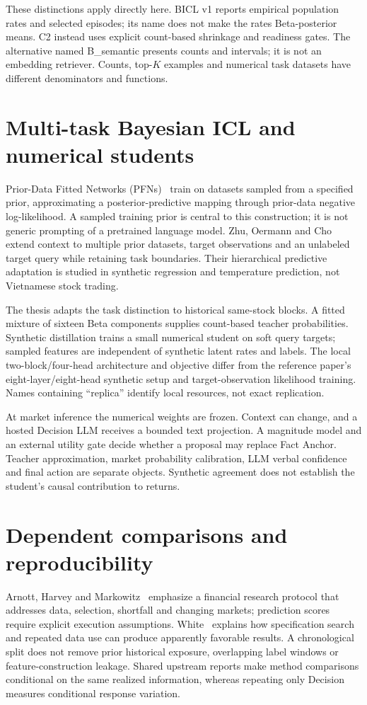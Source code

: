 These distinctions apply directly here. BICL v1 reports empirical
population rates and selected episodes; its name does not make the rates
Beta-posterior means. C2 instead uses explicit count-based shrinkage and
readiness gates. The alternative named B\_semantic presents counts and
intervals; it is not an embedding retriever. Counts, top-$K$ examples and
numerical task datasets have different denominators and functions.

\section{Multi-task Bayesian ICL and numerical students}\label{s:b46bc1f71efb86f5}
Prior-Data Fitted Networks (PFNs)~\cite{muller2022transformers} train on datasets sampled from a specified
prior, approximating a posterior-predictive mapping through prior-data
negative log-likelihood. A sampled training prior is central to this
construction; it is not generic prompting of a pretrained language model.
Zhu, Oermann and Cho~\cite{zhu2026multitask} extend context to
multiple prior datasets, target observations and an unlabeled target
query while retaining task boundaries. Their hierarchical predictive
adaptation is studied in synthetic regression and temperature prediction,
not Vietnamese stock trading.

The thesis adapts the task distinction to historical same-stock blocks.
A fitted mixture of sixteen Beta components supplies count-based teacher
probabilities. Synthetic distillation trains a small numerical student
on soft query targets; sampled features are independent of synthetic
latent rates and labels. The local two-block/four-head architecture and
objective differ from the reference paper's eight-layer/eight-head
synthetic setup and target-observation likelihood training. Names
containing ``replica'' identify local resources, not exact replication.

At market inference the numerical weights are frozen. Context can change,
and a hosted Decision LLM receives a bounded text projection. A magnitude
model and an external utility gate decide whether a proposal may replace
Fact Anchor. Teacher approximation, market probability calibration, LLM
verbal confidence and final action are separate objects. Synthetic
agreement does not establish the student's causal contribution to returns.

\section{Dependent comparisons and reproducibility}\label{s:eabd76a8c5a70fc6}
Arnott, Harvey and Markowitz~\cite{arnott2019backtesting} emphasize a financial research protocol that
addresses data, selection, shortfall and changing markets; prediction
scores require explicit execution assumptions.
White~\cite{white2000reality} explains how specification search and repeated data use can produce
apparently favorable results. A chronological
split does not remove prior historical exposure, overlapping label
windows or feature-construction leakage. Shared upstream reports make
method comparisons conditional on the same realized information, whereas
repeating only Decision measures conditional response variation.

